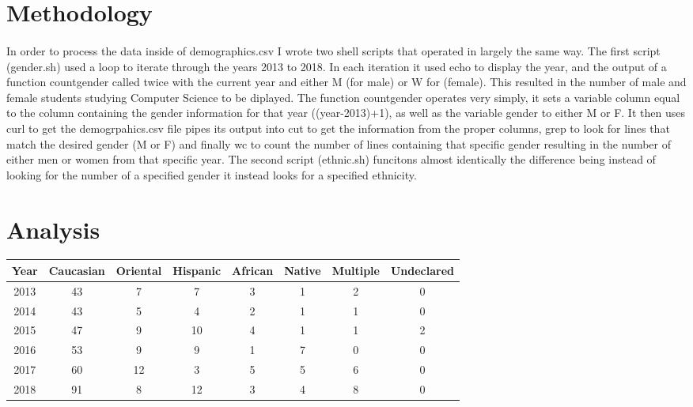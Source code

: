 \documentclass[letterpaper]{article}
\begin{document}

\section*{Methodology}

\paragraph{}

In order to process the data inside of demographics.csv I wrote two 
shell scripts that operated in largely the same way. The first script 
(gender.sh) used a loop to iterate through the years 2013 to 2018. In 
each iteration it used echo to display the year, and the output of a 
function countgender called twice with the current year and either M 
(for male) or W for (female). This resulted in the number of male and 
female students studying Computer Science to be diplayed. The function 
countgender operates very simply, it sets a variable column equal to 
the column containing the gender information for that year 
((year-2013)+1), as well as the variable gender to either M or F. It 
then uses curl to get the demogrpahics.csv file pipes its output into 
cut to get the information from the proper columns, grep to look for 
lines that match the desired gender (M or F) and finally wc to count the 
number of lines containing that specific gender resulting in the number 
of either men or women from that specific year. The second script 
(ethnic.sh) funcitons almost identically the difference being instead of 
looking for the number of a specified gender it instead looks for a specified 
ethnicity.


\section*{Analysis}

\begin{center}
\begin{tabular}{ |c|c|c|c|c|c|c|c| }
 \hline
 Year & Caucasian & Oriental & Hispanic & African & Native & Multiple &  Undeclared \\
 \hline
 2013 & 43 & 7 & 7 & 3 & 1 & 2 & 0 \\
 \hline
 2014 & 43 & 5 & 4 & 2 & 1 & 1 & 0 \\
 \hline
 2015 & 47 & 9 & 10 & 4 & 1 & 1 & 2 \\
 \hline
 2016 & 53 & 9 & 9 & 1 & 7 & 0 & 0 \\
 \hline
 2017 & 60 & 12 & 3 & 5 & 5 & 6 & 0 \\
 \hline
 2018 & 91 & 8 & 12 & 3 & 4 & 8 & 0 \\
 \hline
\end{tabular}
\end{center}
\end{document}
